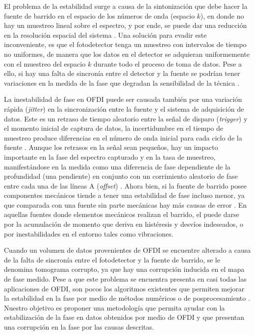 El problema de la estabilidad surge a causa de la sintonización que debe hacer la fuente de barrido en el espacio de los números de onda (espacio $k$), en donde no hay un muestreo lineal sobre el espectro, y por ende, se puede dar  una reducción en la resolución espacial del sistema \cite{Brinkmeyer1990}. Una solución para evadir este inconveniente, es que el fotodetector tenga un muestreo con intervalos de tiempo no uniformes, de manera que los datos en el detector se adquieran uniformemente con el muestreo del espacio $k$ durante todo el proceso de toma de datos. Pese a ello, si hay una falta de sincronía entre el detector y la fuente se podrían tener variaciones en la medida de la fase que degradan la sensibilidad de la técnica \cite{Drexler2015}.

La inestabilidad de fase en OFDI puede ser causada también por una variación rápida (\textit{jitter}) en la sincronización entre la fuente y el sistema de adquisición de datos. Este \jitter es un retraso de tiempo aleatorio entre la señal de disparo (\textit{trigger}) y el momento inicial de captura de datos, la incertidumbre en el tiempo de muestreo produce diferencias en el número de onda inicial para cada ciclo de la fuente \cite{Choi2013,Hong2012}. Aunque los retrasos en la señal sean pequeños, hay un impacto importante en la fase del espectro capturado y en la tasa de muestreo, manifestándose en la medida como una diferencia de fase dependiente de la profundidad (una pendiente) en conjunto con un corrimiento aleatorio de fase entre cada una de las líneas A (\textit{offset}) \cite{Liu2015}. Ahora bien, si la fuente de barrido posee componentes mecánicos tiende a tener una estabilidad de fase incluso menor, ya que comparada con una fuente sin parte mecánicas hay más causas de error \cite{Bonesi2014}. En aquellas fuentes donde elementos mecánicos realizan el barrido, el \jitter puede darse por la acumulación de momento que deriva en histéresis y desvíos indeseados, o por inestabilidades en el entorno tales como vibraciones.

Cuando un volumen de datos provenientes de OFDI se encuentre alterado a causa de la falta de sincronía entre el fotodetector y la fuente de barrido, se le denomina tomograma corrupto, ya que hay una corrupción inducida en el mapa de fase medido. Pese a que este problema se encuentra presenta en casi todas las aplicaciones de OFDI, son pocos los algoritmos existentes que permiten mejorar la estabilidad en la fase por medio de métodos numéricos o de posprocesamiento \cite{Adler2007,Vakoc2005,Hong2012,Liu2015}. Nuestro objetivo es proponer una metodología que permita ayudar con la estabilización de la fase en datos obtenidos por medio de OFDI y que presentan una corrupción en la fase por las causas descritas.


